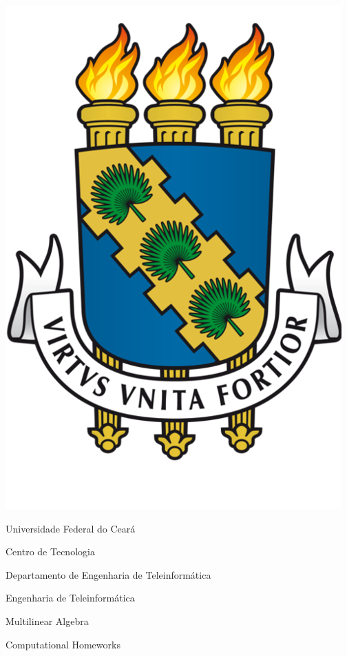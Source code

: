 \thispagestyle{empty}

\begin{center}
  
    \includegraphics[scale=0.10]{figs/icon.png}
    
    \LARGE{Universidade Federal do Ceará}
    
    \LARGE{Centro de Tecnologia}
    
    \LARGE{Departamento de Engenharia de Teleinformática}
    
    \LARGE{Engenharia de Teleinformática}
    
    \vspace{180pt}
      
    \LARGE{Multilinear Algebra}
      
    \LARGE{Computational Homeworks}
      
    \vspace{100pt}
    
\end{center}

